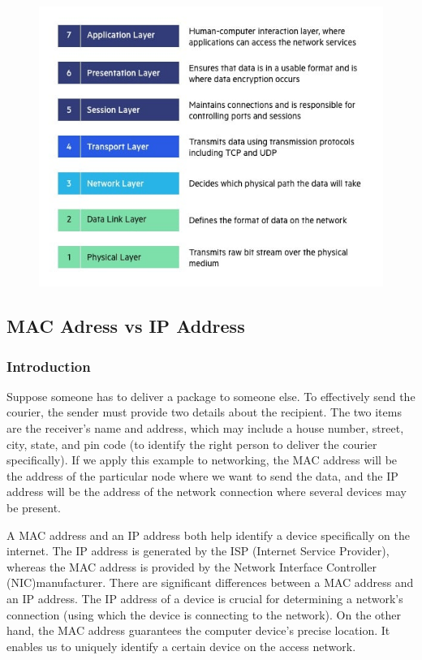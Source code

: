 \documentclass{article}
\begin{document}
\begin{figure}[H]
    \includegraphics[scale=0.6]{pictures/OSI-7-layers.jpg}
    \centering
\end{figure}

\subsection{MAC Adress vs IP Address}

\subsubsection{Introduction}

Suppose someone has to deliver a package to someone else. To effectively send the courier, the sender must provide two details about the recipient. The two items are the receiver's name and address, which may include a house number, street, city, state, and pin code (to identify the right person to deliver the courier specifically). If we apply this example to networking, the MAC address will be the address of the particular node where we want to send the data, and the IP address will be the address of the network connection where several devices may be present.

A MAC address and an IP address both help identify a device specifically on the internet. The IP address is generated by the ISP (Internet Service Provider), whereas the MAC address is provided by the Network Interface Controller (NIC)manufacturer. There are significant differences between a MAC address and an IP address. The IP address of a device is crucial for determining a network's connection (using which the device is connecting to the network). On the other hand, the MAC address guarantees the computer device's precise location. It enables us to uniquely identify a certain device on the access network.
\end{document}
